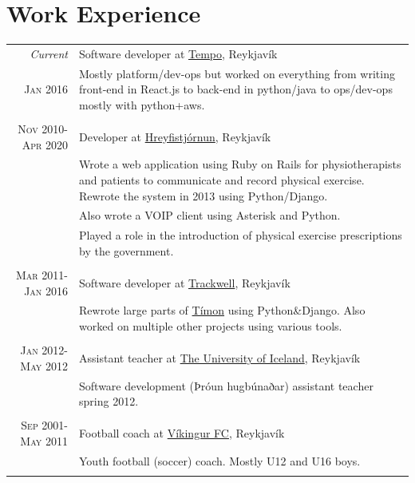 \documentclass[a4paper,10pt]{article}
\begin{document}
\section{Work Experience}
\begin{tabular}{r|p{10cm}}
 \emph{Current} & Software developer at \href{www.tempo.io}{Tempo}, Reykjavík \\\textsc{Jan 2016}&\footnotesize{Mostly platform/dev-ops but worked on everything from writing front-end in React.js to back-end in python/java to ops/dev-ops mostly with python+aws.}\\\multicolumn{2}{c}{} \\

 \textsc{Nov 2010-Apr 2020} & Developer at \href{www.hreyfistjornun.is}{Hreyfistjórnun}, Reykjavík \\&\footnotesize{Wrote a web application using Ruby on Rails for physiotherapists and patients to communicate and record physical exercise. Rewrote the
system in 2013 using Python/Django.}\\
& \footnotesize{Also wrote a VOIP client using Asterisk and Python.}\\
& \footnotesize{Played a role in the introduction of physical exercise
prescriptions by the government.}\\\multicolumn{2}{c}{} \\

 \textsc{Mar 2011-Jan 2016} & Software developer at \href{www.trackwell.com}{Trackwell}, Reykjavík \\&\footnotesize{Rewrote large parts of \href{www.timon.is}{Tímon} using Python\&Django. Also worked on multiple other projects using various tools.}\\\multicolumn{2}{c}{} \\

 \textsc{Jan 2012-May 2012} & Assistant teacher at \href{www.hi.is}{The University of Iceland}, Reykjavík \\&\footnotesize{Software development (Þróun hugbúnaðar) assistant teacher spring 2012.}\\\multicolumn{2}{c}{} \\

 \textsc{Sep 2001-May 2011} & Football coach at \href{www.vikingur.is}{Víkingur FC}, Reykjavík \\&\footnotesize{Youth football (soccer) coach. Mostly U12 and U16 boys.}\\\multicolumn{2}{c}{} \\

 \end{tabular}
\end{document}
